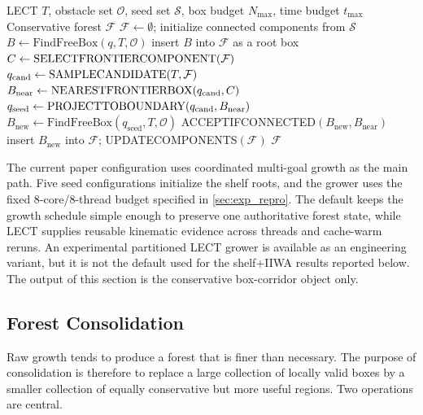 \documentclass[journal]{IEEEtran}
\DeclareRobustCommand{\textsc}[1]{\textnormal{\MakeUppercase{#1}}}
\newcommand{\calO}{\ensuremath{\mathcal{O}}}
\begin{document}
\begin{algorithm}[t]
\caption{\textsc{GrowForest}---budgeted connected conservative forest expansion}
\label{alg:forest_growth}
\footnotesize
\begin{algorithmic}[1]
\REQUIRE LECT $T$, obstacle set $\calO$, seed set $\mathcal{S}$, box budget $N_{\max}$, time budget $t_{\max}$
\ENSURE Conservative forest $\mathcal{F}$
\STATE $\mathcal{F} \gets \emptyset$; initialize connected components from $\mathcal{S}$
  \STATE $B \gets \text{FindFreeBox}(q, T, \calO)$
    \STATE insert $B$ into $\mathcal{F}$ as a root box
  \ENDIF
\ENDFOR
{}
  \STATE $C \gets \textsc{SelectFrontierComponent}(\mathcal{F})$
  \STATE $q_{\mathrm{cand}} \gets \textsc{SampleCandidate}(T,\mathcal{F})$
  \STATE $B_{\mathrm{near}} \gets \textsc{NearestFrontierBox}(q_{\mathrm{cand}},C)$
  \STATE $q_{\mathrm{seed}} \gets \textsc{ProjectToBoundary}(q_{\mathrm{cand}},B_{\mathrm{near}})$
  \STATE $B_{\mathrm{new}} \gets \text{FindFreeBox}(q_{\mathrm{seed}}, T, \calO)$
    \STATE \textsc{AcceptIfConnected}$(B_{\mathrm{new}},B_{\mathrm{near}})$
    \STATE insert $B_{\mathrm{new}}$ into $\mathcal{F}$; \textsc{UpdateComponents}$(\mathcal{F})$
  \ENDIF
\ENDWHILE
\STATE \RETURN $\mathcal{F}$
\end{algorithmic}
\end{algorithm}

The current paper configuration uses coordinated multi-goal growth as the main
path. Five seed configurations initialize the shelf roots, and the grower uses
the fixed 8-core/8-thread budget specified in \cref{sec:exp_repro}. The default
keeps the growth schedule simple enough to preserve one authoritative forest
state, while LECT supplies reusable kinematic evidence across threads and
cache-warm reruns. An experimental partitioned LECT grower is available as an
engineering variant, but it is not the default used for the shelf+IIWA results
reported below. The output of this section is the conservative box-corridor
object only.

\subsection{Forest Consolidation}\label{sec:forest_consolidation}

Raw growth tends to produce a forest that is finer than necessary. The purpose
of consolidation is therefore to replace a large collection of locally valid
boxes by a smaller collection of equally conservative but more useful regions.
Two operations are central.
\end{document}
